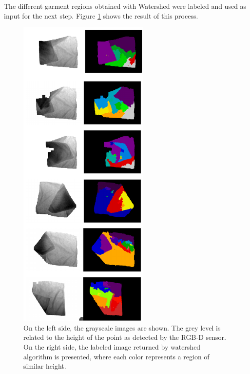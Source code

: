 The different garment regions obtained with Watershed were labeled and used as input for the next step. Figure \ref{fig:watershed_labels} shows the result of this process.

\begin{figure}[thpb]
    \centering
    \includegraphics[width=0.58\textwidth]{figures/colour_garment.pdf}
    \caption{On the left side, the grayscale images are shown. The grey level is related to the height of the point as detected by the RGB-D sensor. On the right side, the labeled image returned by watershed algorithm is presented, where each color represents a region of similar height.}
    \label{fig:watershed_labels}
\end{figure}